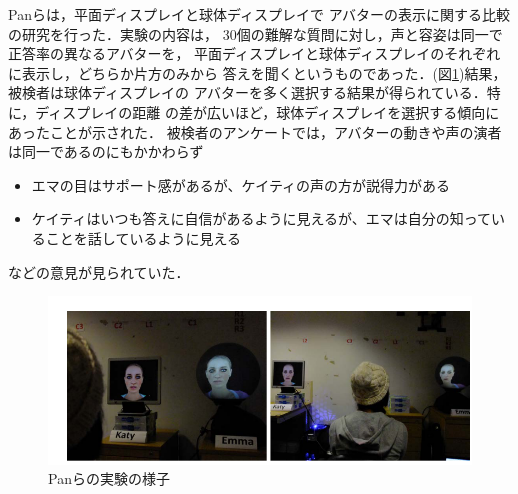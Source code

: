 Panら\cite{26}は，平面ディスプレイと球体ディスプレイで
アバターの表示に関する比較の研究を行った．実験の内容は，
30個の難解な質問に対し，声と容姿は同一で正答率の異なるアバターを，
平面ディスプレイと球体ディスプレイのそれぞれに表示し，どちらか片方のみから
答えを聞くというものであった．(図\ref{avaterexp})結果，被検者は球体ディスプレイの
アバターを多く選択する結果が得られている．特に，ディスプレイの距離
の差が広いほど，球体ディスプレイを選択する傾向にあったことが示された．
被検者のアンケートでは，アバターの動きや声の演者は同一であるのにもかかわらず
\begin{itemize}
  \item エマの目はサポート感があるが、ケイティの声の方が説得力がある
  \item ケイティはいつも答えに自信があるように見えるが、エマは自分の知っていることを話しているように見える
\end{itemize}
などの意見が見られていた．

\begin{figure}[tbp]
  \centering
  \includegraphics[scale=0.6]{fig/avaterexp.png}
  \caption{Panらの実験の様子\cite{26}}\label{avaterexp}
\end{figure}


